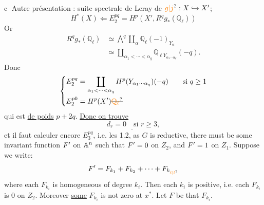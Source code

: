 \textcircled{c} Autre présentation  : suite spectrale de Leray de $\unsure{g|j}:X\hookrightarrow X'$; \unsure{=}
\[
H^*(X)\Longleftarrow E_2^{pq}=H^p(X',R^q g_*(\mathbb{Q}_\ell))
\]
Or
\[
\begin{aligned}
R^q g_*(\mathbb{Q}_\ell)&\simeq\mathop{\bigwedge}^{q}\coprod_\alpha\mathbb{Q}_\ell(-1)_{Y_\alpha}\\
&\simeq\coprod_{\alpha_1<\cdots<\alpha_q}\mathbb{Q}_{\ell Y_{\alpha_1\cdots\alpha_q}}(-q).
\end{aligned}
\]
Donc
\[
\left\{\begin{aligned}
E_2^{pq}&=\coprod_{\alpha_1<\cdots<\alpha_q}H^p(Y_{\alpha_1\cdots\alpha_q})(-q)\qquad\text{si }q\geq1\\
E_2^{p0}&=H^p(X')\deleted{\unsure{\mathbb{Q}_\ell}}
\end{aligned}\right.
\]
qui est \uline{de poids} $p+2q$. \uline{Donc on trouve} 
\[
\underline{d_r=0\quad\text{si }r\geq3},
\]
et il faut calculer encore $E_3^{pq}$,  i.e. les
1.2, as $G$ is reductive, there must be some invariant function $F'$ on $\mathbb{A}^n$ such that $F'=0$ on $Z_2$, and $F'=1$ on $Z_1$. Suppose we write:
\[
F\handwritten{'}=F_{k_1}+F_{k_2}+\cdots+F_{k_{\handwritten{\unsure{\ell|l}}}}
\]
where each $F_{k_i}$ is homogeneous of degree $k_i$. Then each $k_i$ is positive, i.e. each $F_{k_i}$ is $0$ on $Z_2$. Moreover \uline{some} $F_{k_i}$ is not zero at $x^*$. Let $F$ be that $F_{k_i}$.

